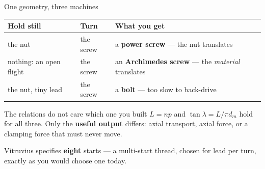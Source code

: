 \documentclass[aspectratio=169,10pt]{beamer}
\begin{document}
\begin{frame}{One geometry, three machines}
\centering\small
\begin{tabular}{@{}lll@{}}
\toprule
Hold still & Turn & What you get\\
\midrule
the nut & the screw & a \textbf{power screw} --- the nut translates\\
nothing: an open flight & the screw & an \textbf{Archimedes screw} --- the \emph{material} translates\\
the nut, tiny lead & the screw & a \textbf{bolt} --- too slow to back-drive\\
\bottomrule
\end{tabular}
\vfill
\raggedright
\begin{block}{The relations do not care which one you built}
$L=np$ \quad and \quad $\tan\lambda = L/\pi d_m$ \quad hold for all three. Only the \textbf{useful
output} differs: axial transport, axial force, or a clamping force that must never move.
\end{block}
\vfill
{\footnotesize Vitruvius specifies \textbf{eight} starts --- a multi-start thread, chosen for lead
per turn, exactly as you would choose one today.}
\end{frame}
\end{document}
